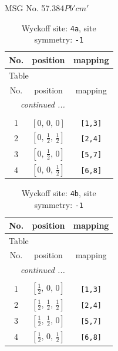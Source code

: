 \documentclass[fleqn,8pt]{jsarticle}
\begin{document}
\setcounter{MaxMatrixCols}{32}

\renewcommand{\tablename}{Table~}
\renewcommand{\figurename}{Figure~}
\begin{center}
\LARGE
MSG No. 57.384\quad$Pb'cm'$
\end{center}
\renewcommand{\arraystretch}{1.2}
\begin{longtable}{ccc}
\caption{Wyckoff site: {\tt 4a}, site symmetry: {\tt -1}}
 \\
 \hline \hline
No. & position & mapping \\ \hline \endfirsthead

\multicolumn{2}{l}{\tablename\ \thetable{}} \\
 \hline \hline
No. & position & mapping \\ \hline \endhead

 \hline \hline
\multicolumn{2}{r}{\footnotesize\it continued ...} \\ \endfoot

 \hline \hline
\multicolumn{2}{r}{} \\ \endlastfoot

1 & $\left[ 0,\, 0,\, 0 \right]$ & {\tt [1,3]} \\ \hline
2 & $\left[ 0,\, \frac{1}{2},\, \frac{1}{2} \right]$ & {\tt [2,4]} \\ \hline
3 & $\left[ 0,\, \frac{1}{2},\, 0 \right]$ & {\tt [5,7]} \\ \hline
4 & $\left[ 0,\, 0,\, \frac{1}{2} \right]$ & {\tt [6,8]} \\
\end{longtable}
\renewcommand{\arraystretch}{1.2}
\begin{longtable}{ccc}
\caption{Wyckoff site: {\tt 4b}, site symmetry: {\tt -1}}
 \\
 \hline \hline
No. & position & mapping \\ \hline \endfirsthead

\multicolumn{2}{l}{\tablename\ \thetable{}} \\
 \hline \hline
No. & position & mapping \\ \hline \endhead

 \hline \hline
\multicolumn{2}{r}{\footnotesize\it continued ...} \\ \endfoot

 \hline \hline
\multicolumn{2}{r}{} \\ \endlastfoot

1 & $\left[ \frac{1}{2},\, 0,\, 0 \right]$ & {\tt [1,3]} \\ \hline
2 & $\left[ \frac{1}{2},\, \frac{1}{2},\, \frac{1}{2} \right]$ & {\tt [2,4]} \\ \hline
3 & $\left[ \frac{1}{2},\, \frac{1}{2},\, 0 \right]$ & {\tt [5,7]} \\ \hline
4 & $\left[ \frac{1}{2},\, 0,\, \frac{1}{2} \right]$ & {\tt [6,8]} \\
\end{longtable}
\end{document}
